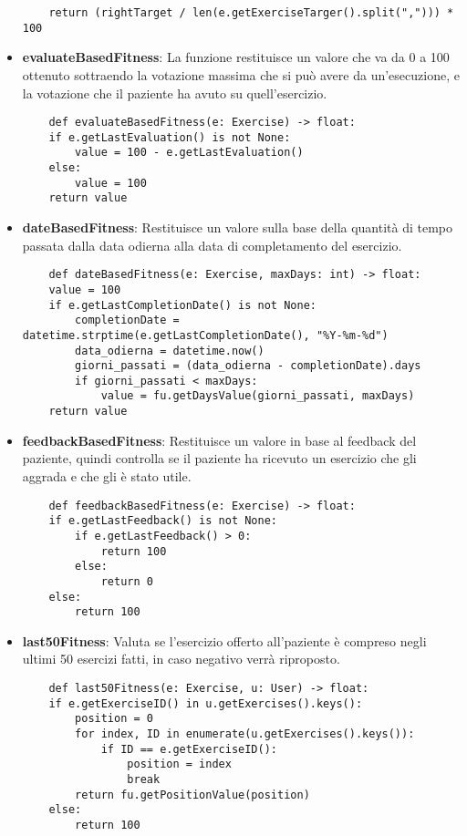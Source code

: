 \documentclass{article}
\begin{document}
\begin{itemize}
\begin{lstlisting}
    return (rightTarget / len(e.getExerciseTarger().split(","))) * 100
\end{lstlisting}

\pagebreak

\item\textbf{evaluateBasedFitness}: La funzione restituisce un valore che va da 0 a 100 ottenuto sottraendo la votazione massima che si può avere da un'esecuzione, e la votazione che il paziente ha avuto su quell'esercizio.
\begin{lstlisting}
    def evaluateBasedFitness(e: Exercise) -> float:
    if e.getLastEvaluation() is not None:
        value = 100 - e.getLastEvaluation()
    else:
        value = 100
    return value
\end{lstlisting}

\item\textbf{dateBasedFitness}: Restituisce un valore sulla base della quantità di tempo passata dalla data odierna alla data di completamento del esercizio.
\begin{lstlisting}
    def dateBasedFitness(e: Exercise, maxDays: int) -> float:
    value = 100
    if e.getLastCompletionDate() is not None:
        completionDate = datetime.strptime(e.getLastCompletionDate(), "%Y-%m-%d")
        data_odierna = datetime.now()
        giorni_passati = (data_odierna - completionDate).days
        if giorni_passati < maxDays:
            value = fu.getDaysValue(giorni_passati, maxDays)
    return value
\end{lstlisting}









\item\textbf{feedbackBasedFitness}: Restituisce un valore in base al feedback del paziente, quindi controlla se il paziente ha ricevuto un esercizio che gli aggrada e che gli è stato utile.
\begin{lstlisting}
    def feedbackBasedFitness(e: Exercise) -> float:
    if e.getLastFeedback() is not None:
        if e.getLastFeedback() > 0:
            return 100
        else:
            return 0
    else:
        return 100
\end{lstlisting}

\item\textbf{last50Fitness}: Valuta se l'esercizio offerto all'paziente è compreso negli ultimi 50 esercizi fatti, in caso negativo verrà riproposto.
\begin{lstlisting}
    def last50Fitness(e: Exercise, u: User) -> float:
    if e.getExerciseID() in u.getExercises().keys():
        position = 0
        for index, ID in enumerate(u.getExercises().keys()):
            if ID == e.getExerciseID():
                position = index
                break
        return fu.getPositionValue(position)
    else:
        return 100
\end{lstlisting}
\end{itemize}
\end{document}
